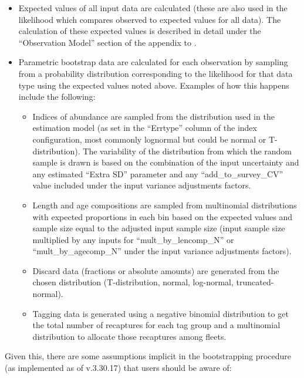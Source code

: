 \begin{itemize}
	\item Expected values of all input data are calculated (these are also used in the likelihood which compares observed to expected values for all data). The calculation of these expected values is described in detail under the ``Observation Model'' section of the appendix to \citet{methotstock2013}.
	
	\item Parametric bootstrap data are calculated for each observation by sampling from a probability distribution corresponding to the likelihood for that data type using the expected values noted above. Examples of how this happens include the following:
	
	\begin{itemize}
		\item Indices of abundance are sampled from the distribution used in the estimation model (as set in the ``Errtype'' column of the index configuration, most commonly lognormal but could be normal or T-distribution). The variability of the distribution from which the random sample is drawn is based on the combination of the input uncertainty and any estimated ``Extra SD'' parameter and any ``add\_to\_survey\_CV'' value included under the input variance adjustments factors.
		
		\item Length and age compositions are sampled from multinomial distributions with expected proportions in each bin based on the expected values and sample size equal to the adjusted input sample size (input sample size multiplied by any inputs for ``mult\_by\_lencomp\_N'' or ``mult\_by\_agecomp\_N'' under the input variance adjustments factors).
		
		\item Discard data (fractions or absolute amounts) are generated from the chosen distribution (T-distribution, normal, log-normal, truncated-normal).
		
		\item Tagging data is generated using a negative binomial distribution to get the total number of recaptures for each tag group and a multinomial distribution to allocate those recaptures among fleets.
	\end{itemize}
\end{itemize}

Given this, there are some assumptions implicit in the bootstrapping procedure (as implemented as of v.3.30.17) that users should be aware of:

